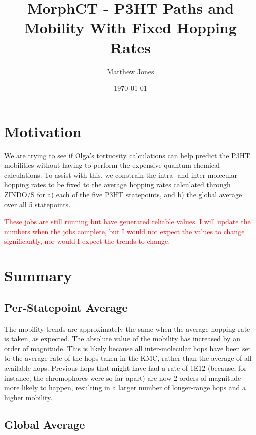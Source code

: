 \documentclass[12pt]{article}
\title{MorphCT - P3HT Paths and Mobility With Fixed Hopping Rates}
\author{Matthew Jones}
\date{\today}
\begin{document}
\maketitle


\section{Motivation}


We are trying to see if Olga's tortuosity calculations can help predict the P3HT mobilities without having to perform the expensive quantum chemical calculations.
To assist with this, we constrain the intra- and inter-molecular hopping rates to be fixed to the average hopping rates calculated through ZINDO/S for a) each of the five P3HT statepoints, and b) the global average over all 5 statepoints.


\textcolor{red}{These jobs are still running but have generated reliable values.
I will update the numbers when the jobs complete, but I would not expect the values to change significantly, nor would I expect the trends to change.}


\section{Summary}

\subsection{Per-Statepoint Average}

The mobility trends are approximately the same when the average hopping rate is taken, as expected.
The absolute value of the mobility has increased by an order of magnitude.
This is likely because all inter-molecular hops have been set to the average rate of the hops taken in the KMC, rather than the average of all available hops.
Previous hops that might have had a rate of 1E12 (because, for instance, the chromophores were so far apart) are now 2 orders of magnitude more likely to happen, resulting in a larger number of longer-range hops and a higher mobility.


\subsection{Global Average}
\end{document}
